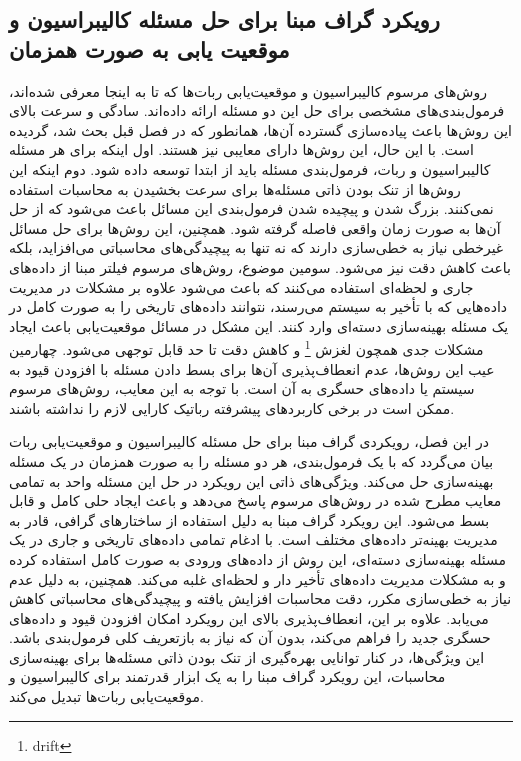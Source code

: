 \subsection{رویکرد گراف مبنا برای حل مسئله کالیبراسیون و موقعیت یابی به صورت همزمان}
روش‌های مرسوم کالیبراسیون و موقعیت‌یابی ربات‌ها که تا به اینجا معرفی شده‌اند، فرمول‌بندی‌های مشخصی برای حل این دو مسئله ارائه داده‌اند. سادگی و سرعت بالای این روش‌ها باعث پیاده‌سازی گسترده آن‌ها، همانطور که در فصل قبل بحث شد، گردیده است. با این حال، این روش‌ها دارای معایبی نیز هستند. 
اول اینکه برای هر مسئله کالیبراسیون و ربات، فرمول‌بندی مسئله باید از ابتدا توسعه داده شود. دوم اینکه  این روش‌ها از تنک بودن ذاتی مسئله‌ها برای سرعت بخشیدن به محاسبات استفاده نمی‌کنند.  بزرگ شدن و پیچیده شدن فرمول‌بندی این مسائل باعث می‌شود که از حل آن‌ها به صورت زمان واقعی فاصله گرفته شود.  همچنین، این روش‌ها برای حل مسائل غیرخطی نیاز به خطی‌سازی دارند که نه تنها به پیچیدگی‌های محاسباتی می‌افزاید، بلکه باعث کاهش دقت نیز می‌شود. 
سومین موضوع،  روش‌های مرسوم فیلتر مبنا از داده‌های جاری و لحظه‌ای استفاده می‌کنند که باعث می‌شود علاوه بر مشکلات در مدیریت داده‌هایی که با تأخیر به سیستم می‌رسند، نتوانند داده‌های تاریخی را به صورت کامل در یک مسئله بهینه‌سازی دسته‌ای وارد کنند. این مشکل در مسائل موقعیت‌یابی باعث ایجاد مشکلات جدی همچون لغزش
\footnote{drift}
و کاهش دقت تا حد قابل توجهی می‌شود. چهارمین عیب این روش‌ها، عدم انعطاف‌پذیری آن‌ها برای بسط دادن مسئله با افزودن قیود به سیستم یا داده‌های حسگری به آن است. با توجه به این معایب، روش‌های مرسوم ممکن است در برخی کاربردهای پیشرفته رباتیک کارایی لازم را نداشته باشند. 

در این فصل، رویکردی گراف مبنا برای حل مسئله کالیبراسیون و موقعیت‌یابی ربات بیان می‌گردد که با یک فرمول‌بندی، هر دو مسئله را به صورت همزمان در یک مسئله بهینه‌سازی حل می‌کند. ویژگی‌های ذاتی این رویکرد در حل این مسئله واحد به تمامی معایب مطرح شده در روش‌های مرسوم پاسخ می‌دهد و باعث ایجاد حلی کامل و قابل بسط می‌شود. این رویکرد گراف مبنا به دلیل استفاده از ساختارهای گرافی، قادر به مدیریت بهینه‌تر داده‌های مختلف است. با ادغام تمامی داده‌های تاریخی و جاری در یک مسئله بهینه‌سازی دسته‌ای، این روش از داده‌های ورودی به صورت کامل استفاده کرده و به مشکلات مدیریت داده‌های تأخیر دار و لحظه‌ای غلبه می‌کند. همچنین، به دلیل عدم نیاز به خطی‌سازی مکرر، دقت محاسبات افزایش یافته و پیچیدگی‌های محاسباتی کاهش می‌یابد. علاوه بر این، انعطاف‌پذیری بالای این رویکرد امکان افزودن قیود و داده‌های حسگری جدید را فراهم می‌کند، بدون آن که نیاز به بازتعریف کلی فرمول‌بندی باشد. این ویژگی‌ها، در کنار توانایی بهره‌گیری از تنک بودن ذاتی مسئله‌ها برای بهینه‌سازی محاسبات، این رویکرد گراف مبنا را به یک ابزار قدرتمند برای کالیبراسیون و موقعیت‌یابی ربات‌ها تبدیل می‌کند.

